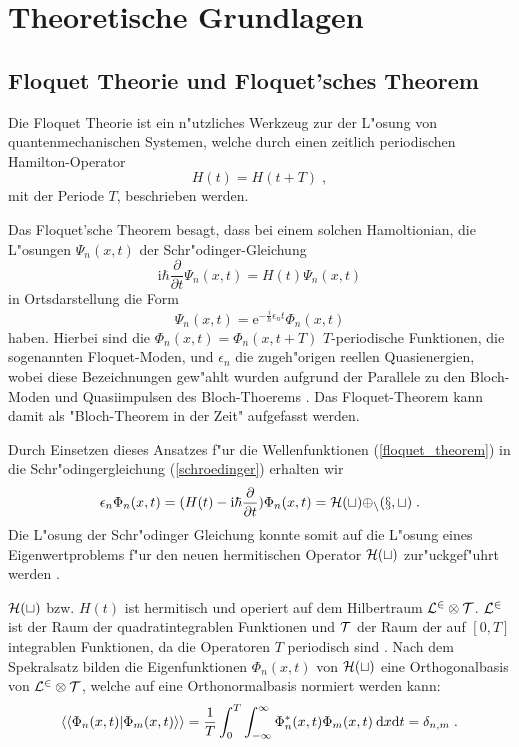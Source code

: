 \chapter{Theoretische Grundlagen}


\section{Floquet Theorie und Floquet'sches Theorem}
  Die Floquet Theorie ist ein n"utzliches Werkzeug zur der L"osung von quantenmechanischen Systemen, welche durch einen zeitlich periodischen Hamilton-Operator
  \begin{equation}
    H(t) = H(t+T) \; ,
  \end{equation}
  mit der Periode $T$, beschrieben werden.

  Das Floquet'sche Theorem besagt, dass bei einem solchen Hamoltionian, die L"osungen $\Psi_n(x,t)$ der Schr"odinger-Gleichung
  \begin{equation}
    \text{i}\hbar\frac{\partial}{\partial t}\Psi_n(x,t) = H(t)\Psi_n(x,t)
    \label{schroedinger}
  \end{equation}
  in Ortsdarstellung die Form
  \begin{equation}
    \Psi_n(x,t) = \text{e}^{-\frac{i}{\hbar}\epsilon_nt}\Phi_n(x,t)
    \label{floquet_theorem}
  \end{equation}
  haben.
  Hierbei sind die $\Phi_n(x,t) = \Phi_n(x,t+T)$ $T$-periodische Funktionen, die sogenannten Floquet-Moden, und $\epsilon_n$ die zugeh"origen reellen Quasienergien, wobei diese Bezeichnungen gew"ahlt wurden aufgrund der Parallele zu den Bloch-Moden und Quasiimpulsen des Bloch-Thoerems \cite{haenlagrangei}.
  Das Floquet-Theorem kann damit als "Bloch-Theorem in der Zeit" aufgefasst werden.

  Durch Einsetzen dieses Ansatzes f"ur die Wellenfunktionen (\ref{floquet_theorem}) in die Schr"odingergleichung (\ref{schroedinger}) erhalten wir
  \begin{equation}
    \epsilon_n \Phi_n(x,t) = (H(t)-\text{i}\hbar\frac{\partial}{\partial t})\Phi_n(x,t) = \cal{H}(t) \Phi_n(x,t) \; .
    \label{eigenwertproblem}
  \end{equation}
  Die L"osung der Schr"odinger Gleichung konnte somit auf die L"osung eines Eigenwertproblems f"ur den neuen hermitischen Operator $\cal{H}(t)$ zur"uckgef"uhrt werden \cite{sherly}.

  $\cal{H}(t)$ bzw. $H(t)$ ist hermitisch und operiert auf dem Hilbertraum $\cal{L}^2 \otimes \cal{T}$.
  $\cal{L}^2$ ist der Raum der quadratintegrablen Funktionen und $\cal{T}$ der Raum der auf $[0,T]$ integrablen Funktionen, da die Operatoren $T$ periodisch sind \cite{haenggi}.
  Nach dem Spekralsatz bilden die Eigenfunktionen $\Phi_n(x,t)$ von $\cal{H}(t)$ eine Orthogonalbasis von $\cal{L}^2 \otimes \cal{T}$, welche auf eine Orthonormalbasis normiert werden kann:
  \begin{equation}
    \braket{\braket{\Phi_n(x,t)|\Phi_m(x,t)}} = \frac{1}{T} \int_0^T \int_{-\infty}^{\infty} \Phi_n^*(x,t)\Phi_m(x,t) \: \text{d}x\text{d}t = \delta_{n,m} \; .
    \label{skalarprodukt_einzelner}
  \end{equation}



